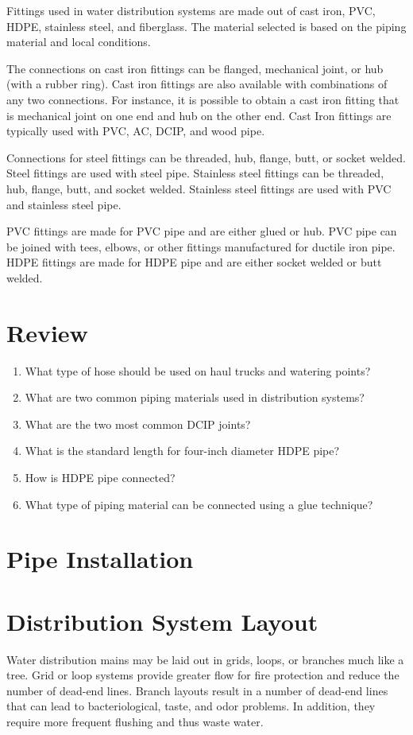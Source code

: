 \documentclass[10pt]{article}
\begin{document}
Fittings used in water distribution systems are made out of cast iron, PVC, HDPE, stainless steel, and fiberglass. The material selected is based on the piping material and local conditions.

The connections on cast iron fittings can be flanged, mechanical joint, or hub (with a rubber ring). Cast iron fittings are also available with combinations of any two connections. For instance, it is possible to obtain a cast iron fitting that is mechanical joint on one end and hub on the other end. Cast Iron fittings are typically used with PVC, AC, DCIP, and wood pipe.

Connections for steel fittings can be threaded, hub, flange, butt, or socket welded. Steel fittings are used with steel pipe. Stainless steel fittings can be threaded, hub, flange, butt, and socket welded. Stainless steel fittings are used with PVC and stainless steel pipe.

PVC fittings are made for PVC pipe and are either glued or hub. PVC pipe can be joined with tees, elbows, or other fittings manufactured for ductile iron pipe. HDPE fittings are made for HDPE pipe and are either socket welded or butt welded.

\section{Review}
\begin{enumerate}
  \item What type of hose should be used on haul trucks and watering points?

  \item What are two common piping materials used in distribution systems?

  \item What are the two most common DCIP joints?

  \item What is the standard length for four-inch diameter HDPE pipe?

  \item How is HDPE pipe connected?

  \item What type of piping material can be connected using a glue technique?

\end{enumerate}
\section{Pipe Installation}
\section{Distribution System Layout}
Water distribution mains may be laid out in grids, loops, or branches much like a tree. Grid or loop systems provide greater flow for fire protection and reduce the number of dead-end lines. Branch layouts result in a number of dead-end lines that can lead to bacteriological, taste, and odor problems. In addition, they require more frequent flushing and thus waste water.
\end{document}
